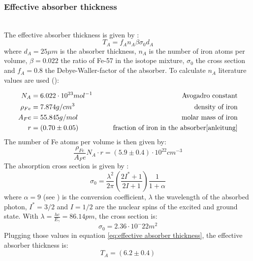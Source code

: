 \subsubsection{Effective absorber thickness}
\label{sec:effab}
 \ \\
The effective absorber thickness is given by \cite{anleitung}:
\begin{equation}
T_A = f_An_A\beta\sigma_0d_A
\label{eq:effective absorber thickness}
\end{equation}
where $d_A = 25\mu m$ is the absorber thickness, $n_A$ is the number of iron atoms per volume, $\beta=0.022$ the ratio of Fe-57 in the isotope mixture, $\sigma_0$ the cross section and $f_A=0.8$ the Debye-Waller-factor of the absorber.
To calculate $n_A$ literature values are used (\cite{webelements}):

\begin{equation*}
\begin{aligned}
N_A &= 6.022 \cdot 10^{23} mol^{-1} \qquad& \text{Avogadro constant}\\
\rho_{Fe} &= 7.874 g/cm^3 \qquad& \text{density of iron} \\
A_Fe &= 55.845 g/mol \qquad& \text{molar mass of iron}\\
r &=  (0.70\pm0.05) \qquad& \text{fraction of iron in the absorber\cite{anleitung}}
\end{aligned}
\end{equation*}
The number of Fe atoms per volume is then given by:
\begin{equation*}
\frac{\rho_{Fe}}{A_Fe}N_A\cdot r= (5.9\pm0.4)\cdot 10^{22} cm^{-3}
\end{equation*}
The absorption cross section is given by \cite{Wegener}:
\begin{equation}
\sigma_0= \frac{\lambda^2}{2\pi} \left(\frac{2I^*+1}{2I+1}\right) \frac{1}{1+\alpha}
\end{equation}
where $\alpha =9$ (see \cite{Wegener}) is the conversion coefficient, $\lambda$ the wavelength of the absorbed photon, $I^*=3/2$ and $I=1/2$  are the nuclear spins of the excited and ground state. With $\lambda = \frac{hc}{E_\gamma}=86.14 pm$, the cross section is:
\begin{equation}
\sigma_0=2.36\cdot 10^-22m^2
\end{equation}
Plugging those values in equation \ref{eq:effective absorber thickness}, the effective absorber thickness is:
\begin{equation}
T_A = (6.2\pm 0.4)
\end{equation}
